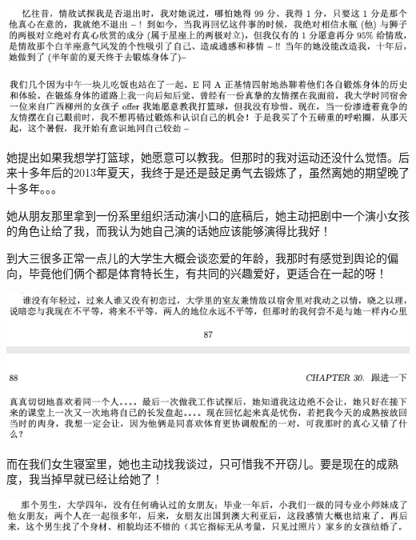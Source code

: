 \documentclass[9pt, b5paper]{article}
\begin{document}
\begin{center}
\includegraphics[width=.9\linewidth]{./pic/backups_plans_20210422_103845.png}
\end{center}

\begin{center}
\includegraphics[width=.9\linewidth]{./pic/backups_plans_20210422_184628.png}
\end{center}

她提出如果我想学打篮球，她愿意可以教我。但那时的我对运动还没什么觉悟。后来十多年后的2013年夏天，我终于是还是鼓足勇气去锻炼了，虽然离她的期望晚了十多年。。。

她从朋友那里拿到一份系里组织活动演小口的底稿后，她主动把剧中一个演小女孩的角色让给了我，而我认为她自己演的话她应该能够演得比我好！

到大三很多正常一点儿的大学生大概会谈恋爱的年龄，我那时有感觉到舆论的偏向，毕竟他们俩个都是体育特长生，有共同的兴趣爱好，更适合在一起的呀！

\begin{center}
\includegraphics[width=.9\linewidth]{./pic/backups_plans_20210422_185215.png}
\end{center}

而在我们女生寝室里，她也主动找我谈过，只可惜我不开窃儿。要是现在的成熟度，我当掉早就已经让给她了！

\begin{center}
\includegraphics[width=.9\linewidth]{./pic/backups_plans_20210422_104150.png}
\end{center}
\end{document}

